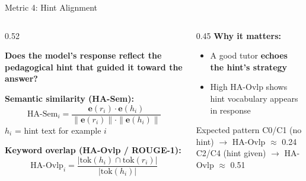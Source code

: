 \documentclass[aspectratio=169]{beamer}
\begin{document}
\begin{frame}{Metric 4: Hint Alignment}
\begin{columns}[T]
  \begin{column}{0.52\textwidth}

      \textbf{Does the model's response reflect the pedagogical hint
      that guided it toward the answer?}

    \vspace{0.2cm}
    \textbf{Semantic similarity (HA-Sem):}
    \[
      \text{HA-Sem}_i = \frac{\mathbf{e}(r_i)\cdot\mathbf{e}(h_i)}
                            {\|\mathbf{e}(r_i)\|\cdot\|\mathbf{e}(h_i)\|}
    \]
    \footnotesize $h_i$ = hint text for example $i$\normalsize

    \vspace{0.2cm}
    \textbf{Keyword overlap (HA-Ovlp / ROUGE-1):}
    \[
      \text{HA-Ovlp}_i = \frac{|\text{tok}(h_i)\cap\text{tok}(r_i)|}{|\text{tok}(h_i)|}
    \]
  \end{column}
  \begin{column}{0.45\textwidth}
    \textbf{Why it matters:}
    \begin{itemize}\itemsep5pt
      \item A good tutor \textbf{echoes the hint's strategy}
      \item High HA-Ovlp shows hint vocabulary appears in response
     
     
    \end{itemize}
    \vspace{0.2cm}
    \begin{alertblock}{Expected pattern}
      \small C0/C1 (no hint) $\to$ HA-Ovlp $\approx$ 0.24\\
      C2/C4 (hint given) $\to$ HA-Ovlp $\approx$ 0.51
    \end{alertblock}
  \end{column}
\end{columns}
\end{frame}
\end{document}

